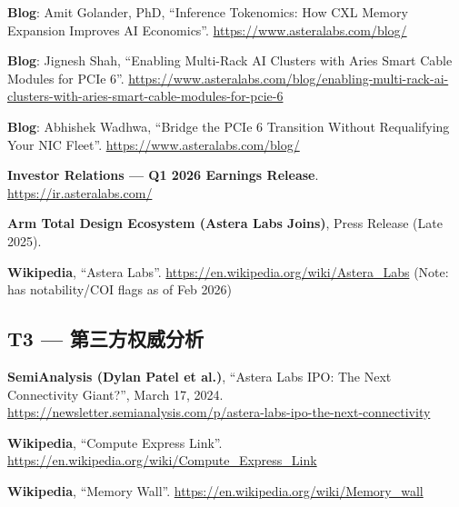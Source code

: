 \begin{enumerate}[label={[T2-\arabic*]}, leftmargin=*, resume]
    \item \textbf{Blog}: Amit Golander, PhD, ``Inference Tokenomics: How CXL Memory Expansion Improves AI Economics''.
    \url{https://www.asteralabs.com/blog/}

    \item \textbf{Blog}: Jignesh Shah, ``Enabling Multi-Rack AI Clusters with Aries Smart Cable Modules for PCIe 6''.
    \url{https://www.asteralabs.com/blog/enabling-multi-rack-ai-clusters-with-aries-smart-cable-modules-for-pcie-6}

    \item \textbf{Blog}: Abhishek Wadhwa, ``Bridge the PCIe 6 Transition Without Requalifying Your NIC Fleet''.
    \url{https://www.asteralabs.com/blog/}

    \item \textbf{Investor Relations — Q1 2026 Earnings Release}.
    \url{https://ir.asteralabs.com/}

    \item \textbf{Arm Total Design Ecosystem (Astera Labs Joins)}, Press Release (Late 2025).

    \item \textbf{Wikipedia}, ``Astera Labs''.
    \url{https://en.wikipedia.org/wiki/Astera_Labs}
    (Note: has notability/COI flags as of Feb 2026)

\end{enumerate}

{}
\subsection*{T3 — 第三方权威分析}

\begin{enumerate}[label={[T3-\arabic*]}, leftmargin=*, resume]
    \item \textbf{SemiAnalysis (Dylan Patel et al.)}, ``Astera Labs IPO: The Next Connectivity Giant?'',
    March 17, 2024.
    \url{https://newsletter.semianalysis.com/p/astera-labs-ipo-the-next-connectivity}

    \item \textbf{Wikipedia}, ``Compute Express Link''.
    \url{https://en.wikipedia.org/wiki/Compute_Express_Link}

    \item \textbf{Wikipedia}, ``Memory Wall''.
    \url{https://en.wikipedia.org/wiki/Memory_wall}
\end{enumerate}

